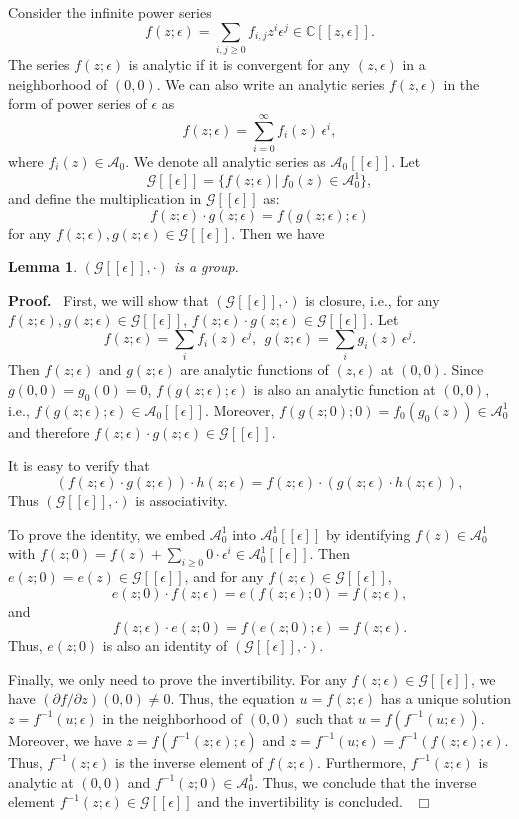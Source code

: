 \documentclass[preprint, 12pt]{elsarticle}
\newtheorem{lem}[thm]{Lemma}
\numberwithin{equation}{section}
\newenvironment{proof}[1][Proof]{\textbf{#1.}\ }{\ $\Box$}
\newcommand{\Comp}{\mathbb{C}}
\newcommand{\A}{\mathcal{A}}
\newcommand{\G}{\mathcal{G}}
\begin{document}
Consider the infinite power series
$$f(z;\epsilon) = \sum_{i,j\geq 0}f_{i,j}z^i\epsilon^j \in \Comp[[z,\epsilon]].$$
The series $f(z;\epsilon)$ is analytic if it is convergent for any
$(z,\epsilon)$ in a neighborhood of $(0,0)$. We can
also write an analytic series $f(z,\epsilon)$ in the form of power series of $\epsilon$ as
$$f(z;\epsilon) = \sum_{i=0}^\infty f_i(z)\,\epsilon^i,$$
where $f_i(z)\in \A_0$. We denote all analytic series as $\A_0[[\epsilon]]$. Let
$$\G[[\epsilon]] = \{f(z;\epsilon) | \ f_0(z)\in \A_0^1\},$$
and define the multiplication in $\G[[\epsilon]]$ as:
$$f(z;\epsilon)\cdot g(z;\epsilon) = f(g(z;\epsilon);\epsilon)$$
for any $ f(z;\epsilon), g(z;\epsilon)\in \G[[\epsilon]]$. Then we have
\begin{lem}
\label{le:46} $(\G[[\epsilon]],\cdot)$ is a group.
\end{lem}
\begin{proof} First, we will show that $(\G[[\epsilon]],\cdot)$ is closure, i.e., for any $f(z;\epsilon), g(z;\epsilon)\in \G[[\epsilon]]$, $f(z;\epsilon)\cdot g(z;\epsilon)\in
\G[[\epsilon]]$. Let
$$f(z;\epsilon) = \sum_{i} f_i(z)\,\epsilon^j,\ \ g(z;\epsilon) = \sum_{i}g_{i}(z)\,\epsilon^j.$$
Then $f(z;\epsilon)$ and $g(z;\epsilon)$ are analytic functions of
$(z,\epsilon)$ at $(0,0)$. Since $g(0,0) = g_0(0) = 0$,
$f(g(z;\epsilon);\epsilon)$ is also an analytic function at
$(0,0)$, i.e., $f(g(z;\epsilon);\epsilon)\in \A_0[[\epsilon]]$.
Moreover, $f(g(z;0);0) = f_0(g_0(z))\in \A_0^1$ and therefore
$f(z;\epsilon)\cdot g(z;\epsilon)\in \G[[\epsilon]]$.

It is easy to verify that
$$(f(z;\epsilon)\cdot g(z;\epsilon)) \cdot h(z;\epsilon) = f(z;\epsilon)\cdot (g(z;\epsilon) \cdot h(z;\epsilon)), $$
Thus $(\G[[\epsilon]],\cdot)$ is associativity.

To prove the identity, we embed $\A_0^1$ into $\A_0^1[[\epsilon]]$ by identifying
$f(z)\in \A_0^1$ with $f(z;0) = f(z) +
\sum_{i\geq0}0\cdot\epsilon^i\in \A_0^1[[\epsilon]]$. Then $e(z;0)
= e(z)\in \G[[\epsilon]]$, and for any $f(z;\epsilon)\in
\G[[\epsilon]]$,
$$e(z;0)\cdot f(z;\epsilon) = e(f(z;\epsilon);0) = f(z;\epsilon),$$
and
$$f(z;\epsilon)\cdot e(z;0) = f(e(z;0);\epsilon) = f(z;\epsilon).$$
Thus, $e(z;0)$ is also an identity of $(\G[[\epsilon]], \cdot)$.

Finally, we only need to prove the invertibility. For any $f(z;\epsilon)\in \G[[\epsilon]]$, we have $(\partial
f/\partial z)(0,0)\not=0$. Thus, the equation $u = f(z;\epsilon)$
has a unique solution $z = f^{-1}(u;\epsilon)$ in the neighborhood
of $(0,0)$ such that $u = f(f^{-1}(u;\epsilon))$. Moreover, we have
$z = f(f^{-1}(z;\epsilon);\epsilon)$ and $z =
f^{-1}(u;\epsilon) = f^{-1}(f(z;\epsilon);\epsilon)$. Thus,
$f^{-1}(z;\epsilon)$ is the inverse element of $f(z;\epsilon)$.
Furthermore, $f^{-1}(z;\epsilon)$ is analytic at $(0,0)$ and
$f^{-1}(z;0)\in \A_0^1$. Thus, we conclude that the inverse element
$f^{-1}(z;\epsilon)\in \G[[\epsilon]]$ and the invertibility is concluded.
\end{proof}
\end{document}
